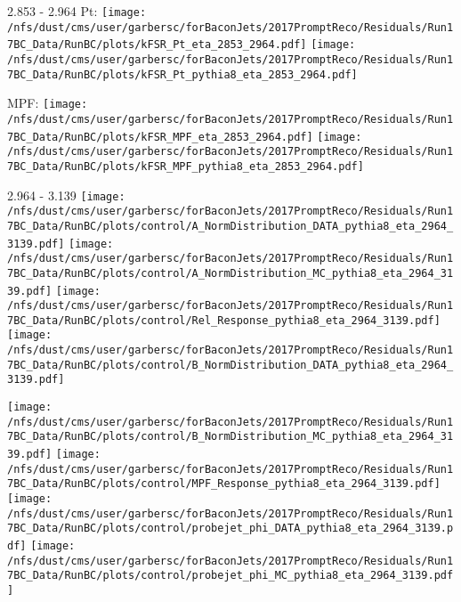 \documentclass[t,compress]{beamer}
\begin{document}
\begin{frame}{2.853 - 2.964}
	 Pt: \texttt{[image: /nfs/dust/cms/user/garbersc/forBaconJets/2017PromptReco/Residuals/Run17BC\_Data/RunBC/plots/kFSR\_Pt\_eta\_2853\_2964.pdf]}
	\texttt{[image: /nfs/dust/cms/user/garbersc/forBaconJets/2017PromptReco/Residuals/Run17BC\_Data/RunBC/plots/kFSR\_Pt\_pythia8\_eta\_2853\_2964.pdf]}
\newline

	 MPF: \texttt{[image: /nfs/dust/cms/user/garbersc/forBaconJets/2017PromptReco/Residuals/Run17BC\_Data/RunBC/plots/kFSR\_MPF\_eta\_2853\_2964.pdf]}
	\texttt{[image: /nfs/dust/cms/user/garbersc/forBaconJets/2017PromptReco/Residuals/Run17BC\_Data/RunBC/plots/kFSR\_MPF\_pythia8\_eta\_2853\_2964.pdf]}
\end{frame}

\begin{frame}{2.964 - 3.139}
	\texttt{[image: /nfs/dust/cms/user/garbersc/forBaconJets/2017PromptReco/Residuals/Run17BC\_Data/RunBC/plots/control/A\_NormDistribution\_DATA\_pythia8\_eta\_2964\_3139.pdf]}
	\texttt{[image: /nfs/dust/cms/user/garbersc/forBaconJets/2017PromptReco/Residuals/Run17BC\_Data/RunBC/plots/control/A\_NormDistribution\_MC\_pythia8\_eta\_2964\_3139.pdf]}
	\texttt{[image: /nfs/dust/cms/user/garbersc/forBaconJets/2017PromptReco/Residuals/Run17BC\_Data/RunBC/plots/control/Rel\_Response\_pythia8\_eta\_2964\_3139.pdf]}
	\texttt{[image: /nfs/dust/cms/user/garbersc/forBaconJets/2017PromptReco/Residuals/Run17BC\_Data/RunBC/plots/control/B\_NormDistribution\_DATA\_pythia8\_eta\_2964\_3139.pdf]}
\newline

	\texttt{[image: /nfs/dust/cms/user/garbersc/forBaconJets/2017PromptReco/Residuals/Run17BC\_Data/RunBC/plots/control/B\_NormDistribution\_MC\_pythia8\_eta\_2964\_3139.pdf]}
	\texttt{[image: /nfs/dust/cms/user/garbersc/forBaconJets/2017PromptReco/Residuals/Run17BC\_Data/RunBC/plots/control/MPF\_Response\_pythia8\_eta\_2964\_3139.pdf]}
	\texttt{[image: /nfs/dust/cms/user/garbersc/forBaconJets/2017PromptReco/Residuals/Run17BC\_Data/RunBC/plots/control/probejet\_phi\_DATA\_pythia8\_eta\_2964\_3139.pdf]}
	\texttt{[image: /nfs/dust/cms/user/garbersc/forBaconJets/2017PromptReco/Residuals/Run17BC\_Data/RunBC/plots/control/probejet\_phi\_MC\_pythia8\_eta\_2964\_3139.pdf]}
\end{frame}
\end{document}

